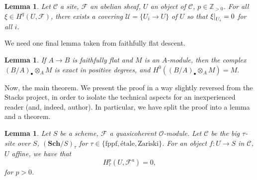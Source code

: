 \documentclass{amsart}
\newcommand{\Sch}{\mathbf{Sch}}
\newtheorem{lemma}[theorem]{Lemma}
\theoremstyle{definition}
\theoremstyle{remark}
\newcommand\restr[2]{{%
  \left.\kern-\nulldelimiterspace %
  #1 %
  \vphantom{|} %
  \right|_{#2} %
  }}
\begin{document}
\begin{lemma}
    Let $\mathcal{C}$ a site, $\mathcal{F}$ an abelian sheaf, $U$ an object of
    $\mathcal{C}$, $p \in \mathbb{Z}_{> 0}$. For all $\xi \in H^q(U,
    \mathcal{F})$, there exists a covering $\mathcal{U} = \{U_i \to U\}$ of
    $U$ so that $\restr{\xi}{U_i} = 0$ for all $i$.
\end{lemma}

We need one final lemma taken from faithfully flat descent.

\begin{lemma}
    If $A \to B$ is faithfully flat and $M$ is an $A$-module, then the complex
    $(B/A)_{\bullet} \otimes_A M$ is exact in positive degrees, and
    $H^0((B/A)_{\bullet} \otimes_A M) = M$.
\end{lemma}

Now, the main theorem. We present the proof in a way slightly reversed from the
Stacks project, in order to isolate the technical aspects for an inexperienced
reader (and, indeed, author). In particular, we have split the proof into a
lemma and a theorem.

\begin{lemma}
    Let $S$ be a scheme, $\mathcal{F}$ a quasicoherent $\mathcal{O}$-module. Let
    $\mathcal{C}$ be the big $\tau$-site over $S$, $(\Sch/S)_\tau$ for $\tau \in
    \{\text{fppf}, \text{\'etale}, \text{Zariski}\}$. For an object $f : U \to
    S$ in $\mathcal{C}$, $U$ affine, we have that
    \[
        H^p_{\tau}(U, \mathcal{F}^a) = 0,
    \]
    for $p > 0$.
\end{lemma}
\end{document}
